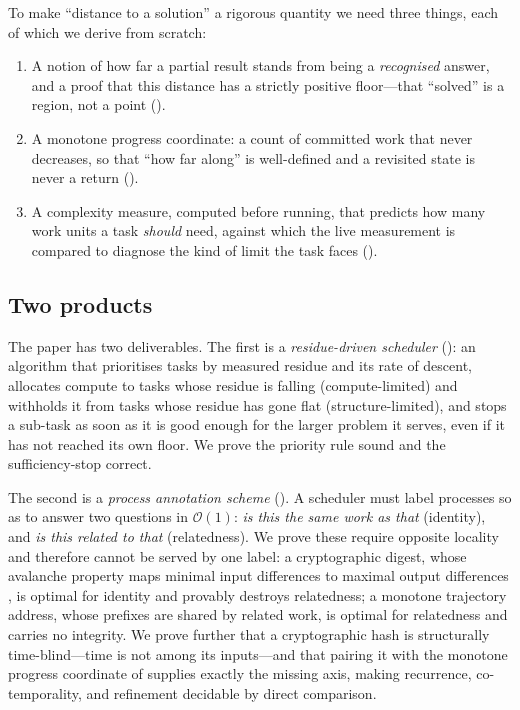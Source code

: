 \documentclass[twocolumn,10pt,a4paper]{article}
\theoremstyle{thmstyle}
\theoremstyle{definition}
\theoremstyle{remark}
\begin{document}
To make ``distance to a solution'' a rigorous quantity we need three
things, each of which we derive from scratch:

\begin{enumerate}[leftmargin=1.4em,itemsep=2pt]
\item A notion of how far a partial result stands from being a
\emph{recognised} answer, and a proof that this distance has a strictly
positive floor---that ``solved'' is a region, not a point
().
\item A monotone progress coordinate: a count of committed work that
never decreases, so that ``how far along'' is well-defined and a
revisited state is never a return ().
\item A complexity measure, computed before running, that predicts how
many work units a task \emph{should} need, against which the live
measurement is compared to diagnose the kind of limit the task faces
().
\end{enumerate}

\subsection{Two products}

The paper has two deliverables. The first is a \emph{residue-driven
scheduler} (): an algorithm that prioritises tasks
by measured residue and its rate of descent, allocates compute to tasks
whose residue is falling (compute-limited) and withholds it from tasks
whose residue has gone flat (structure-limited), and stops a sub-task as
soon as it is good enough for the larger problem it serves, even if it
has not reached its own floor. We prove the priority rule sound and the
sufficiency-stop correct.

The second is a \emph{process annotation scheme}
(). A scheduler must label processes so as to answer
two questions in $\mathcal{O}(1)$: \emph{is this the same work as that}
(identity), and \emph{is this related to that} (relatedness). We prove
these require opposite locality and therefore cannot be served by one
label: a cryptographic digest, whose avalanche property maps minimal
input differences to maximal output differences \citep{shannon1949,
webster1986,feistel1973}, is optimal for identity and provably destroys
relatedness; a monotone trajectory address, whose prefixes are shared by
related work, is optimal for relatedness and carries no integrity. We
prove further that a cryptographic hash is structurally time-blind---time
is not among its inputs---and that pairing it with the monotone progress
coordinate of  supplies exactly the missing axis, making
recurrence, co-temporality, and refinement decidable by direct
comparison.
\end{document}
